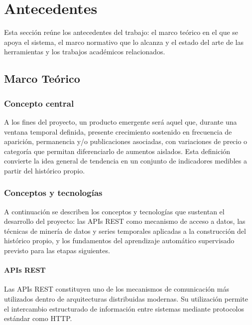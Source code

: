 \chapter{Antecedentes}\label{chapter01}

Esta sección reúne los antecedentes del trabajo: el marco teórico en el que se apoya el sistema, el marco normativo que lo alcanza y el estado del arte de las herramientas y los trabajos académicos relacionados.

\section{Marco Teórico}\label{sec:marco-teorico}

\subsection{Concepto central}\label{sec:concepto-central}

A los fines del proyecto, un producto emergente será aquel que, durante una ventana temporal definida, presente crecimiento sostenido en frecuencia de aparición, permanencia y/o publicaciones asociadas, con variaciones de precio o categoría que permitan diferenciarlo de aumentos aislados. Esta definición convierte la idea general de tendencia en un conjunto de indicadores medibles a partir del histórico propio.

\subsection{Conceptos y tecnologías}\label{sec:tecnologias-utilizadas}

A continuación se describen los conceptos y tecnologías que sustentan el desarrollo del proyecto: las APIs REST como mecanismo de acceso a datos, las técnicas de minería de datos y series temporales aplicadas a la construcción del histórico propio, y los fundamentos del aprendizaje automático supervisado previsto para las etapas siguientes.

\subsubsection{APIs REST}

Las APIs REST constituyen uno de los mecanismos de comunicación más utilizados dentro de arquitecturas distribuidas modernas. Su utilización permite el intercambio estructurado de información entre sistemas mediante protocolos estándar como HTTP.

